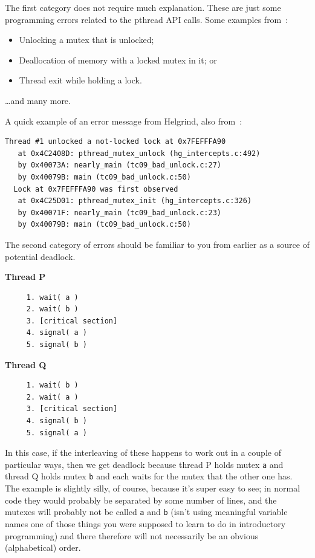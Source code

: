 \documentclass[a4paper]{report}
\begin{document}
The first category does not require much explanation. These are just some programming errors related to the pthread API calls. Some examples from~\cite{helgrind}:

\begin{itemize}[noitemsep]
	\item Unlocking a mutex that is unlocked;
	\item Deallocation of memory with a locked mutex in it; or
	\item Thread exit while holding a lock.
\end{itemize}
\ldots and many more.

A quick example of an error message from Helgrind, also from~\cite{helgrind}:

\begin{lstlisting}
Thread #1 unlocked a not-locked lock at 0x7FEFFFA90
   at 0x4C2408D: pthread_mutex_unlock (hg_intercepts.c:492)
   by 0x40073A: nearly_main (tc09_bad_unlock.c:27)
   by 0x40079B: main (tc09_bad_unlock.c:50)
  Lock at 0x7FEFFFA90 was first observed
   at 0x4C25D01: pthread_mutex_init (hg_intercepts.c:326)
   by 0x40071F: nearly_main (tc09_bad_unlock.c:23)
   by 0x40079B: main (tc09_bad_unlock.c:50)
\end{lstlisting}



The second category of errors should be familiar to you from earlier as a source of potential deadlock.

\begin{multicols}{2}
	\textbf{Thread P}\vspace{-2em}
	\begin{verbatim}
	 1. wait( a ) 
	 2. wait( b )
	 3. [critical section]
	 4. signal( a )
	 5. signal( b )
  \end{verbatim}
	\columnbreak
	\textbf{Thread Q}\vspace{-2em}
	\begin{verbatim}
	 1. wait( b ) 
	 2. wait( a )
	 3. [critical section]
	 4. signal( b )
	 5. signal( a )
  \end{verbatim}
\end{multicols}
\vspace{-2em}

In this case, if the interleaving of these happens to work out in a couple of particular ways, then we get deadlock because thread P holds mutex \texttt{a} and thread Q holds mutex \texttt{b} and each waits for the mutex that the other one has. The example is slightly silly, of course, because it's super easy to see; in normal code they would probably be separated by some number of lines, and the mutexes will probably not be called \texttt{a} and \texttt{b} (isn't using meaningful variable names one of those things you were supposed to learn to do in introductory programming\textinterrobang) and there therefore will not necessarily be an obvious (alphabetical) order.
\end{document}

